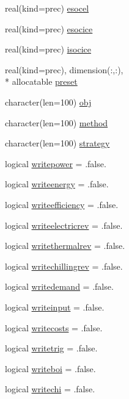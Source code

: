 \begin{DoxyCompactItemize}
real(kind=prec) \hyperlink{classinputvar_a761214782c22ee31b6da74c0984cb9e2}{esocel}
\item 
real(kind=prec) \hyperlink{classinputvar_a776d3af64b707011e9ee688472f48ce1}{esocice}
\item 
real(kind=prec) \hyperlink{classinputvar_a0d3d0c4c3088dc7f9fa83b70ace2a119}{isocice}
\item 
real(kind=prec), dimension(\-:,\-:), \\*
allocatable \hyperlink{classinputvar_aa1aed76f7740ae664d53528987ef0efa}{preset}
\item 
character(len=100) \hyperlink{classinputvar_ab5d2f467a214e31204c18a24582b81bb}{obj}
\item 
character(len=100) \hyperlink{classinputvar_ad9c1a09ed4bd46ad673997ee302451a4}{method}
\item 
character(len=100) \hyperlink{classinputvar_a6e328846c755855ac2ac87d5a63d402a}{strategy}
\item 
logical \hyperlink{classinputvar_ae3e0dfd2907bb36d0f62715b24f63536}{writepower} = .false.
\item 
logical \hyperlink{classinputvar_ae3e52c17a47fe8dd3e860abff881cfb0}{writeenergy} = .false.
\item 
logical \hyperlink{classinputvar_a7d67f2fa2027e1d60264f442eef9759c}{writeefficiency} = .false.
\item 
logical \hyperlink{classinputvar_afd3b4bc26c396eaba06cecc08717acf1}{writeelectricrev} = .false.
\item 
logical \hyperlink{classinputvar_ae7817d3a1abb7e02fdd1d3f40b45a4e8}{writethermalrev} = .false.
\item 
logical \hyperlink{classinputvar_a2d475a99a1a0efcca534104cf8e2efb5}{writechillingrev} = .false.
\item 
logical \hyperlink{classinputvar_ad6cafaf46b6d0f5bfaeb1ca26ccd0c68}{writedemand} = .false.
\item 
logical \hyperlink{classinputvar_a97c8b194b0db24c1c790d57bcc7b0f70}{writeinput} = .false.
\item 
logical \hyperlink{classinputvar_a5fa854d48ca73d10b807273f373076b2}{writecosts} = .false.
\item 
logical \hyperlink{classinputvar_a676701049b4d18d378d94894b1fcae7b}{writetrig} = .false.
\item 
logical \hyperlink{classinputvar_adfc2c014d1631c831bd700d9ff13dcff}{writeboi} = .false.
\item 
logical \hyperlink{classinputvar_a6e34f329672526cc9e682125013ce5e7}{writechi} = .false.

\end{DoxyCompactItemize}
